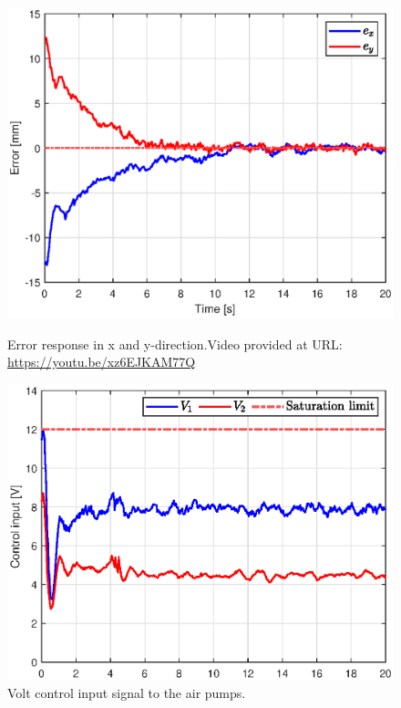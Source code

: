 \begin{figure}[H] 
    \begin{minipage}[b]{0.49\linewidth}
     \centering
    \includegraphics[width=\linewidth]{Figures/Chapter5/errorswingleftsquare.eps} 
    \caption{Error response in x and y-direction.Video provided at URL: \url{https://youtu.be/xz6EJKAM77Q}} 
    \label{fig5:errorswingleft} 
       \end{minipage} 
    \begin{minipage}[b]{0.49\linewidth}
     \centering
    \includegraphics[width=\linewidth]{Figures/Chapter5/controlinputswingleft.eps} 
    \caption{Volt control input signal to the air pumps.} 
    \label{fig5:inputswingleft} 
    \end{minipage} 
\end{figure}



